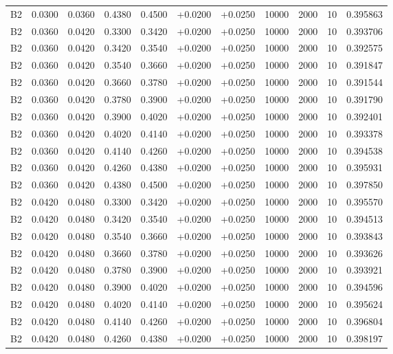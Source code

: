 \documentclass{article}
\begin{document}
\begin{longtable}{l r r r r r r r r r l}
B2 & 0.0300 & 0.0360 & 0.4380 & 0.4500 & +0.0200 & +0.0250 & 10000 & 2000 & 10 & 0.395863 \\
B2 & 0.0360 & 0.0420 & 0.3300 & 0.3420 & +0.0200 & +0.0250 & 10000 & 2000 & 10 & 0.393706 \\
B2 & 0.0360 & 0.0420 & 0.3420 & 0.3540 & +0.0200 & +0.0250 & 10000 & 2000 & 10 & 0.392575 \\
B2 & 0.0360 & 0.0420 & 0.3540 & 0.3660 & +0.0200 & +0.0250 & 10000 & 2000 & 10 & 0.391847 \\
B2 & 0.0360 & 0.0420 & 0.3660 & 0.3780 & +0.0200 & +0.0250 & 10000 & 2000 & 10 & 0.391544 \\
B2 & 0.0360 & 0.0420 & 0.3780 & 0.3900 & +0.0200 & +0.0250 & 10000 & 2000 & 10 & 0.391790 \\
B2 & 0.0360 & 0.0420 & 0.3900 & 0.4020 & +0.0200 & +0.0250 & 10000 & 2000 & 10 & 0.392401 \\
B2 & 0.0360 & 0.0420 & 0.4020 & 0.4140 & +0.0200 & +0.0250 & 10000 & 2000 & 10 & 0.393378 \\
B2 & 0.0360 & 0.0420 & 0.4140 & 0.4260 & +0.0200 & +0.0250 & 10000 & 2000 & 10 & 0.394538 \\
B2 & 0.0360 & 0.0420 & 0.4260 & 0.4380 & +0.0200 & +0.0250 & 10000 & 2000 & 10 & 0.395931 \\
B2 & 0.0360 & 0.0420 & 0.4380 & 0.4500 & +0.0200 & +0.0250 & 10000 & 2000 & 10 & 0.397850 \\
B2 & 0.0420 & 0.0480 & 0.3300 & 0.3420 & +0.0200 & +0.0250 & 10000 & 2000 & 10 & 0.395570 \\
B2 & 0.0420 & 0.0480 & 0.3420 & 0.3540 & +0.0200 & +0.0250 & 10000 & 2000 & 10 & 0.394513 \\
B2 & 0.0420 & 0.0480 & 0.3540 & 0.3660 & +0.0200 & +0.0250 & 10000 & 2000 & 10 & 0.393843 \\
B2 & 0.0420 & 0.0480 & 0.3660 & 0.3780 & +0.0200 & +0.0250 & 10000 & 2000 & 10 & 0.393626 \\
B2 & 0.0420 & 0.0480 & 0.3780 & 0.3900 & +0.0200 & +0.0250 & 10000 & 2000 & 10 & 0.393921 \\
B2 & 0.0420 & 0.0480 & 0.3900 & 0.4020 & +0.0200 & +0.0250 & 10000 & 2000 & 10 & 0.394596 \\
B2 & 0.0420 & 0.0480 & 0.4020 & 0.4140 & +0.0200 & +0.0250 & 10000 & 2000 & 10 & 0.395624 \\
B2 & 0.0420 & 0.0480 & 0.4140 & 0.4260 & +0.0200 & +0.0250 & 10000 & 2000 & 10 & 0.396804 \\
B2 & 0.0420 & 0.0480 & 0.4260 & 0.4380 & +0.0200 & +0.0250 & 10000 & 2000 & 10 & 0.398197 \\

\end{longtable}
\end{document}
